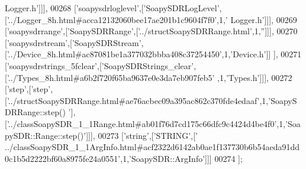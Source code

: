 \begin{DoxyCode}
{      Logger.h'}]]],
00268   [\textcolor{stringliteral}{'soapysdrloglevel'},[\textcolor{stringliteral}{'SoapySDRLogLevel'},[\textcolor{stringliteral}{'../Logger\_8h.html#acca12132060bee17ae201b1c9604f7f0'},1,\textcolor{stringliteral}{'
      Logger.h'}]]],
00269   [\textcolor{stringliteral}{'soapysdrrange'},[\textcolor{stringliteral}{'SoapySDRRange'},[\textcolor{stringliteral}{'../structSoapySDRRange.html'},1,\textcolor{stringliteral}{''}]]],
00270   [\textcolor{stringliteral}{'soapysdrstream'},[\textcolor{stringliteral}{'SoapySDRStream'},[\textcolor{stringliteral}{'../Device\_8h.html#ac87081be1a377032bbba408c37254450'},1,\textcolor{stringliteral}{'Device.h'}]]
      ],
00271   [\textcolor{stringliteral}{'soapysdrstrings\_5fclear'},[\textcolor{stringliteral}{'SoapySDRStrings\_clear'},[\textcolor{stringliteral}{'../Types\_8h.html#a6b2f720f65ba9637e0e3da7eb907feb5'}
      ,1,\textcolor{stringliteral}{'Types.h'}]]],
00272   [\textcolor{stringliteral}{'step'},[\textcolor{stringliteral}{'step'},[\textcolor{stringliteral}{'../structSoapySDRRange.html#ae76acbec09a395ac862c370fde4edaaf'},1,\textcolor{stringliteral}{'SoapySDRRange::step()
      '}],[\textcolor{stringliteral}{'../classSoapySDR\_1\_1Range.html#ab01f76d7cd175c66dfc9c4424d4be4f0'},1,\textcolor{stringliteral}{'SoapySDR::Range::step()'}]]],
00273   [\textcolor{stringliteral}{'string'},[\textcolor{stringliteral}{'STRING'},[\textcolor{stringliteral}{'
      ../classSoapySDR\_1\_1ArgInfo.html#acf2322d6142ab0ae1f137730b6b54aeda91dd0c1b5d2222bf60a8975fe24a0551'},1,\textcolor{stringliteral}{'SoapySDR::ArgInfo'}]]]
00274 ];
\end{DoxyCode}
